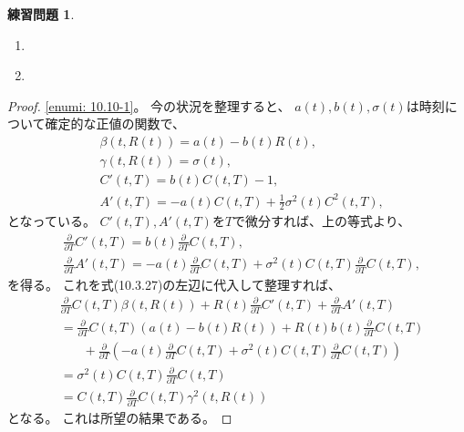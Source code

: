 \documentclass[uplatex]{jsarticle}
\theoremstyle{definition}
\newtheorem{prob}[prob]{練習問題}
\begin{document}
\begin{prob}\label{prob: 10.10}
  \begin{enumerate}
    \item \label{enumi: 10.10-1}
    \item \label{enumi: 10.10-2}
  \end{enumerate}
\end{prob}

\begin{proof}
  \ref{enumi: 10.10-1}。
  今の状況を整理すると、
  \(a(t),b(t),\sigma(t)\)は時刻について確定的な正値の関数で、
  \begin{align*}
    &\beta(t,R(t)) = a(t) - b(t)R(t), \\
    &\gamma(t,R(t)) = \sigma(t), \\
    &C'(t,T) = b(t)C(t,T) - 1, \\
    &A'(t,T) = -a(t)C(t,T) + \frac{1}{2}\sigma^2(t)C^2(t,T),
  \end{align*}
  となっている。
  \(C'(t,T),A'(t,T)\)を\(T\)で微分すれば、上の等式より、
  \begin{align*}
    &\frac{\partial}{\partial T}C'(t,T)
    = b(t) \frac{\partial}{\partial T}C(t,T), \\
    &\frac{\partial}{\partial T}A'(t,T)
    = - a(t) \frac{\partial}{\partial T}C(t,T)
    + \sigma^2(t)C(t,T)\frac{\partial}{\partial T}C(t,T),
  \end{align*}
  を得る。
  これを式(10.3.27)の左辺に代入して整理すれば、
  \begin{align*}
    &\frac{\partial}{\partial T}C(t,T)\beta(t,R(t))
    + R(t)\frac{\partial}{\partial T}C'(t,T)
    + \frac{\partial}{\partial T}A'(t,T) \\
    &= \frac{\partial}{\partial T}C(t,T)\left( a(t) - b(t)R(t) \right)
    + R(t)b(t) \frac{\partial}{\partial T}C(t,T) \\
    &\ \ \ \ \ \ \ \
    + \frac{\partial}{\partial T}
    \left( - a(t) \frac{\partial}{\partial T}C(t,T)
    + \sigma^2(t)C(t,T)\frac{\partial}{\partial T}C(t,T) \right) \\
    &= \sigma^2(t)C(t,T)\frac{\partial}{\partial T}C(t,T) \\
    &= C(t,T)\frac{\partial}{\partial T}C(t,T)\gamma^2(t,R(t))
  \end{align*}
  となる。
  これは所望の結果である。


\end{proof}
\end{document}
